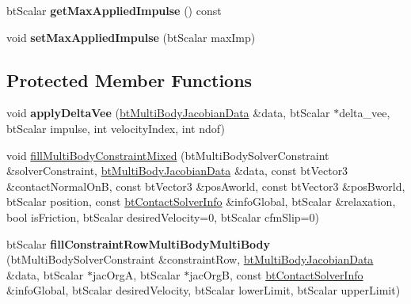 \begin{DoxyCompactItemize}
\item 
\hypertarget{classbt_multi_body_constraint_a42b83f866c4b1443001eb10aaa47f433}{bt\+Scalar {\bfseries get\+Max\+Applied\+Impulse} () const }\label{classbt_multi_body_constraint_a42b83f866c4b1443001eb10aaa47f433}

\item 
\hypertarget{classbt_multi_body_constraint_aa5c88ed393fe5d4f1e0b1f840117bbe7}{void {\bfseries set\+Max\+Applied\+Impulse} (bt\+Scalar max\+Imp)}\label{classbt_multi_body_constraint_aa5c88ed393fe5d4f1e0b1f840117bbe7}

\end{DoxyCompactItemize}
\subsection*{Protected Member Functions}
\begin{DoxyCompactItemize}
\item 
\hypertarget{classbt_multi_body_constraint_a6a963a721e318ee010fadb4b12fbc33b}{void {\bfseries apply\+Delta\+Vee} (\hyperlink{structbt_multi_body_jacobian_data}{bt\+Multi\+Body\+Jacobian\+Data} \&data, bt\+Scalar $\ast$delta\+\_\+vee, bt\+Scalar impulse, int velocity\+Index, int ndof)}\label{classbt_multi_body_constraint_a6a963a721e318ee010fadb4b12fbc33b}

\item 
void \hyperlink{classbt_multi_body_constraint_a0cdd1b0d275d96edff7accc9df216370}{fill\+Multi\+Body\+Constraint\+Mixed} (bt\+Multi\+Body\+Solver\+Constraint \&solver\+Constraint, \hyperlink{structbt_multi_body_jacobian_data}{bt\+Multi\+Body\+Jacobian\+Data} \&data, const bt\+Vector3 \&contact\+Normal\+On\+B, const bt\+Vector3 \&pos\+Aworld, const bt\+Vector3 \&pos\+Bworld, bt\+Scalar position, const \hyperlink{structbt_contact_solver_info}{bt\+Contact\+Solver\+Info} \&info\+Global, bt\+Scalar \&relaxation, bool is\+Friction, bt\+Scalar desired\+Velocity=0, bt\+Scalar cfm\+Slip=0)
\item 
\hypertarget{classbt_multi_body_constraint_a8bc70e38d498ba56f1c562a004235368}{bt\+Scalar {\bfseries fill\+Constraint\+Row\+Multi\+Body\+Multi\+Body} (bt\+Multi\+Body\+Solver\+Constraint \&constraint\+Row, \hyperlink{structbt_multi_body_jacobian_data}{bt\+Multi\+Body\+Jacobian\+Data} \&data, bt\+Scalar $\ast$jac\+Org\+A, bt\+Scalar $\ast$jac\+Org\+B, const \hyperlink{structbt_contact_solver_info}{bt\+Contact\+Solver\+Info} \&info\+Global, bt\+Scalar desired\+Velocity, bt\+Scalar lower\+Limit, bt\+Scalar upper\+Limit)}\label{classbt_multi_body_constraint_a8bc70e38d498ba56f1c562a004235368}

\end{DoxyCompactItemize}
